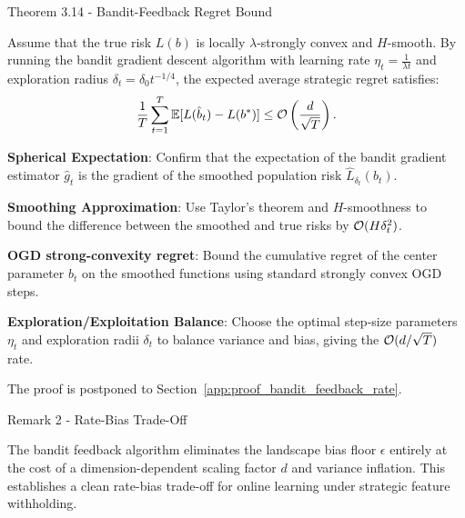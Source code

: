 \begin{sourceblock}{Theorem 3.14 - Bandit-Feedback Regret Bound}
\begin{theorem}
\label{thm:bandit_feedback_rate}
Assume that the true risk $L(b)$ is locally $\lambda$-strongly convex and $H$-smooth. By running the bandit gradient descent algorithm with learning rate $\eta_t = \frac{1}{\lambda t}$ and exploration radius $\delta_t = \delta_0 t^{-1/4}$, the expected average strategic regret satisfies:
\begin{equation}
    \label{eq:bandit_feedback_bound}
    \frac{1}{T}\sum_{t=1}^T \mathbb{E}[L(\hat{b}_t) - L(b^*)] \le \mathcal{O}\left( \frac{d}{\sqrt{T}} \right).
\end{equation}
\end{theorem}
\end{sourceblock}

\begin{guideblock}
\item \textbf{Spherical Expectation}: Confirm that the expectation of the bandit gradient estimator $\hat{g}_t$ is the gradient of the smoothed population risk $\hat{L}_{\delta_t}(b_t)$.
\item \textbf{Smoothing Approximation}: Use Taylor's theorem and $H$-smoothness to bound the difference between the smoothed and true risks by $\mathcal{O}(H\delta_t^2)$.
\item \textbf{OGD strong-convexity regret}: Bound the cumulative regret of the center parameter $b_t$ on the smoothed functions using standard strongly convex OGD steps.
\item \textbf{Exploration/Exploitation Balance}: Choose the optimal step-size parameters $\eta_t$ and exploration radii $\delta_t$ to balance variance and bias, giving the $\mathcal{O}(d/\sqrt{T})$ rate.
\end{guideblock}
The proof is postponed to Section~\ref{app:proof_bandit_feedback_rate}.

\begin{sourceblock}{Remark 2 - Rate-Bias Trade-Off}
\begin{remark}
The bandit feedback algorithm eliminates the landscape bias floor $\epsilon$ entirely at the cost of a dimension-dependent scaling factor $d$ and variance inflation. This establishes a clean rate-bias trade-off for online learning under strategic feature withholding.
\end{remark}
\end{sourceblock}

\begin{faqblock}
\faqanswers
{}
\end{faqblock}
